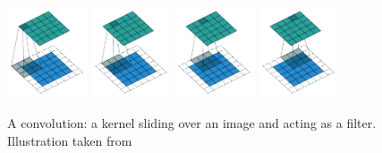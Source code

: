 \begin{figure}[t]
    \centering
    \includegraphics[width=0.21\textwidth]{figures/main/ch2-background/conv_00.pdf}
    \hfill
    \includegraphics[width=0.21\textwidth]{figures/main/ch2-background/conv_01.pdf}
    \hfill
    \includegraphics[width=0.21\textwidth]{figures/main/ch2-background/conv_02.pdf}
    \hfill
    \includegraphics[width=0.21\textwidth]{figures/main/ch2-background/conv_03.pdf}
    \caption{A convolution: a kernel sliding over an image and acting as a filter. \\Illustration taken from~\citet{dumoulin2016guide}}
    \label{figure:illustration_convolution}
\end{figure}




